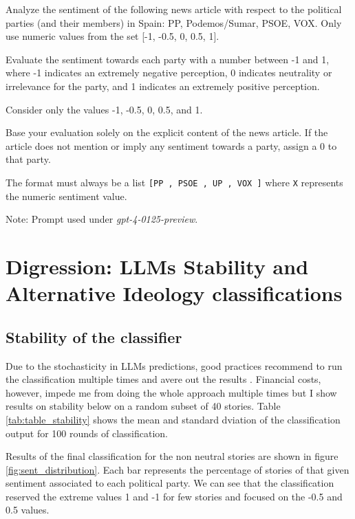 \documentclass[12pt]{article}
\begin{document}
	
	
	
	

	
	
	\begin{tcolorbox}[colback=blue!5!white, colframe=blue!75!black, title=Prompt]
		Analyze the sentiment of the following news article with respect to the political parties (and their members) in Spain: PP, Podemos/Sumar, PSOE, VOX. Only use numeric values from the set [-1, -0.5, 0, 0.5, 1].
		
		Evaluate the sentiment towards each party with a number between -1 and 1, where -1 indicates an extremely negative perception, 0 indicates neutrality or irrelevance for the party, and 1 indicates an extremely positive perception.
		
		Consider only the values -1, -0.5, 0, 0.5, and 1.
		
		Base your evaluation solely on the explicit content of the news article. If the article does not mention or imply any sentiment towards a party, assign a 0 to that party.
		
		The format must always be a list \texttt{[PP
			, PSOE
			, UP
			, VOX
			]} where \texttt{X} represents the numeric sentiment value.
		

	\end{tcolorbox}
Note: 	Prompt used under \textit{gpt-4-0125-preview}.

\section{ Digression: LLMs Stability and Alternative Ideology classifications }
	\label{sec:sent_stability}
	
	
	\subsection*{Stability of the classifier}
	
	Due to the stochasticity in LLMs predictions, good practices recommend to run the classification multiple times and avere out the results \citep{tornberg2023}. Financial costs, however, impede me from doing the whole approach multiple times but I show results on stability below on a random subset of  40 stories. Table \ref{tab:table_stability} shows the mean and standard dviation of the classification output for 100 rounds of classification. 
	
	Results of the final classification for the non neutral stories are shown in figure \ref{fig:sent_distribution}. Each bar represents the percentage of stories of that given sentiment associated to each political party. We can see that the classification reserved the extreme values 1 and -1 for few stories and focused on the -0.5 and 0.5 values. 
	
\end{document}
